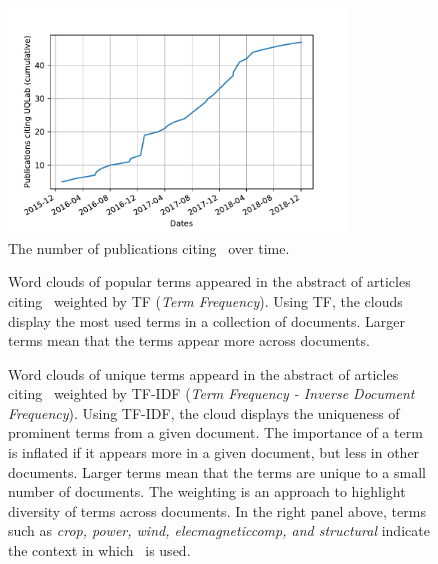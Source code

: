 \documentclass[11pt]{article}
\begin{document}
\begin{figure}[!ht]
  \centering
  \includegraphics[width=0.8\textwidth]{citing.pdf}
  \caption{The number of publications citing \uqlab~over time.}
  \label{fig:citing}
\end{figure}


\begin{figure}
\centering     %
{}
\caption{Word clouds of popular terms appeared in the abstract of articles citing \uqlab~weighted by TF (\emph{Term Frequency}). Using TF, the clouds display the most used terms in a collection of documents. Larger terms mean that the terms appear more across documents.}
\label{fig:citing_tf}
\end{figure}

\begin{figure}
\centering     %
{}
\caption{Word clouds of unique terms appeard in the abstract of articles citing \uqlab~weighted by TF-IDF (\emph{Term Frequency - Inverse Document Frequency}). Using TF-IDF, the cloud displays the uniqueness of prominent terms from a given document. The importance of a term is inflated if it appears more in a given document, but less in other documents. Larger terms mean that the terms are unique to a small number of documents. The weighting is an approach to highlight diversity of terms across documents. In the right panel above, terms such as \emph{crop, power, wind, elecmagneticcomp, and structural} indicate the context in which \uqlab~is used.}
\label{fig:citing_tfidf}
\end{figure}
\end{document}
